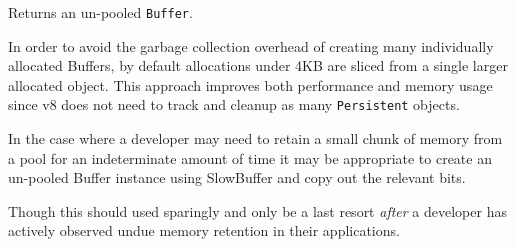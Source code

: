 Returns an un-pooled \texttt{Buffer}.

In order to avoid the garbage collection overhead of creating many
individually allocated Buffers, by default allocations under 4KB are
sliced from a single larger allocated object. This approach improves
both performance and memory usage since v8 does not need to track and
cleanup as many \texttt{Persistent} objects.

In the case where a developer may need to retain a small chunk of memory
from a pool for an indeterminate amount of time it may be appropriate to
create an un-pooled Buffer instance using SlowBuffer and copy out the
relevant bits.

\begin{Shaded}
\begin{Highlighting}[]
 

\NormalTok{(}\NormalTok{, }\NormalTok{() \{}
   \NormalTok{();}
    \NormalTok{);}
  \NormalTok{, }\NormalTok{, }\NormalTok{);}
\NormalTok{\});}
\end{Highlighting}
\end{Shaded}

Though this should used sparingly and only be a last resort \emph{after}
a developer has actively observed undue memory retention in their
applications.
